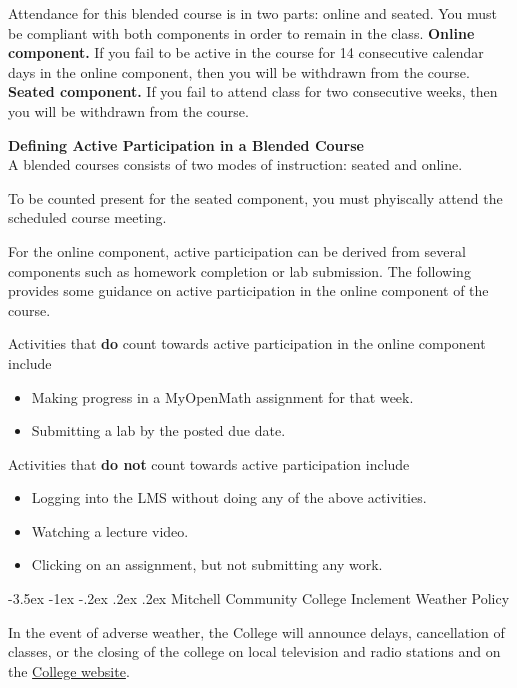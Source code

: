 \documentclass{article}
\makeatletter
\renewcommand\section{\@startsection{section}{1}{0pt}%
  {-3.5ex \@plus -1ex \@minus -.2ex}%
  {.2ex \@plus.2ex}%
  {\normalfont\Large\bfseries}} %
\renewenvironment{framed}[1][]{%
  \def\FrameCommand{%
    \hspace{1pt}%
    {\color{mybordercolor}\vrule width 2pt} %
    \hspace{1pt}%
    \fboxsep=\FrameSep%
    \colorbox{mybgcolor}%
  }%
  \MakeFramed {\advance\hsize-\width \FrameRestore}%
}{%
  \endMakeFramed
}
\makeatother
\begin{document}
Attendance for this blended course is in two parts:  online and seated.  You must be compliant with both components in order to remain in the class.
\textbf{Online component.} If you fail to be active in the course for 14 consecutive calendar days in the online component, then you will be withdrawn from the course.\newline
\textbf{Seated component.} If you fail to attend class for two consecutive weeks, then you will be withdrawn from the course.

\begin{framed}
\textbf{Defining Active Participation in a Blended Course}\\
A blended courses consists of two modes of instruction: seated and online.

To be counted present for the seated component, you must phyiscally attend the scheduled course meeting.

For the online component, active participation can be derived from several components such as homework completion or lab submission. The following provides some guidance on active participation in the online component of the course.

Activities that \textbf{do} count towards active participation in the online component include

\begin{itemize}
\item Making progress in a MyOpenMath assignment for that week.
\item Submitting a lab by the posted due date.
\end{itemize}

Activities that \textbf{do not} count towards active participation include

\begin{itemize}
\item Logging into the LMS without doing any of the above activities.
\item Watching a lecture video.
\item Clicking on an assignment, but not submitting any work.
\end{itemize}
\end{framed}

\section{Mitchell Community College Inclement Weather Policy}

In the event of adverse weather, the College will announce delays, cancellation of classes, or the closing of the college on local television and radio stations and on the \href{https://www.mitchellcc.edu}{College website}.
\end{document}
